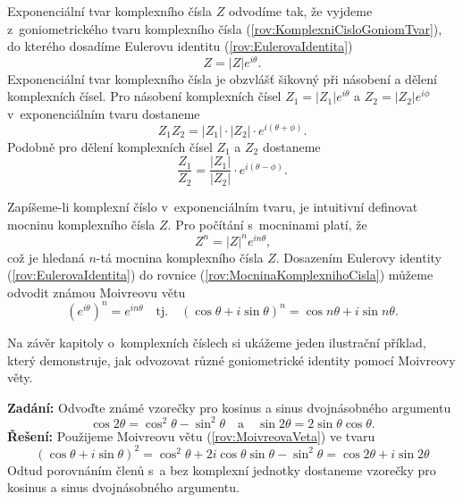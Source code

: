 Exponenciální tvar komplexního čísla $Z$ odvodíme tak, že vyjdeme z~goniometrického tvaru komplexního čísla (\ref{rov:KomplexniCisloGoniomTvar}), do kterého dosadíme Eulerovu identitu (\ref{rov:EulerovaIdentita})
\begin{equation}
Z = |Z| e^{i \theta} \mbox{.}
\label{rov:ExponencialniTvar}
\end{equation}
Exponenciální tvar komplexního čísla je obzvlášť šikovný při násobení a dělení komplexních čísel. Pro násobení komplexních čísel $Z_1 = |Z_1| e^{i \theta}$ a $Z_2 = |Z_2|e^{i \phi}$ v~exponenciálním tvaru dostaneme
\begin{equation}
Z_1Z_2 = |Z_1| \cdot |Z_2| \cdot e^{i(\theta + \phi)} \mbox{.}
\label{rov:NasobeniExponencialniTvar} 
\end{equation}
Podobně pro dělení komplexních čísel $Z_1$ a $Z_2$ dostaneme
\begin{equation}
\frac{Z_1}{Z_2} = \frac{|Z_1|}{|Z_2|} \cdot e^{i(\theta - \phi)} \mbox{.}
\label{rov:DeleniExponencialniTvar}
\end{equation}

Zapíšeme-li komplexní číslo v~exponenciálním tvaru, je intuitivní definovat mocninu komplexního čísla $Z$. Pro počítání s~mocninami platí, že 
\begin{equation}
Z^n = |Z|^n e^{in\theta} \mbox{,}
\label{rov:MocninaKomplexnihoCisla}
\end{equation}
což je hledaná $n$-tá mocnina komplexního čísla $Z$. Dosazením Eulerovy identity (\ref{rov:EulerovaIdentita}) do rovnice (\ref{rov:MocninaKomplexnihoCisla}) můžeme odvodit známou Moivreovu větu
\begin{equation}
(e^{i\theta})^n = e^{i n \theta} \quad \mbox{tj.} \quad (\cos \theta + i \sin \theta )^n = \cos n\theta + i \sin n\theta \mbox{.}
\label{rov:MoivreovaVeta}
\end{equation}

Na závěr kapitoly o~komplexních číslech si ukážeme jeden ilustrační příklad, který demonstruje, jak odvozovat různé goniometrické identity pomocí Moivreovy věty.

\begin{priklad}
\textbf{Zadání:} Odvoďte známé vzorečky pro kosinus a sinus dvojnásobného argumentu
\begin{displaymath}
\cos 2\theta = \cos^2 \theta - \sin^2 \theta \quad \mbox{a} \quad
\sin 2\theta = 2 \sin \theta \cos \theta \mbox{.}
\end{displaymath}
\textbf{Řešení:} Použijeme Moivreovu větu (\ref{rov:MoivreovaVeta}) ve tvaru
\begin{displaymath}
(\cos \theta + i \sin \theta )^2 = \cos^2 \theta + 2 i \cos \theta \sin \theta - \sin^2 \theta = \cos 2 \theta + i \sin 2 \theta
\end{displaymath}
Odtud porovnáním členů s~a bez komplexní jednotky dostaneme vzorečky pro kosinus a sinus dvojnásobného argumentu.
\end{priklad}

